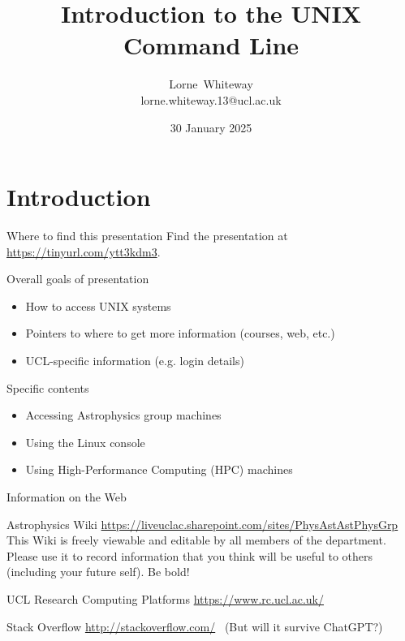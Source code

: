 \documentclass{beamer}
\title{Introduction to the UNIX Command Line}
\author{Lorne~Whiteway \\ lorne.whiteway.13@ucl.ac.uk}
\institute[UCL]
{
  Astrophysics Group\\
  Department of Physics and Astronomy\\
  University College London
}
\date
{30 January 2025}
\begin{document}
\frame{\titlepage}

\section{Introduction}

\begin{frame}{Where to find this presentation}
    Find the presentation at \alert{\url{https://tinyurl.com/ytt3kdm3}}.\\
\end{frame}


\begin{frame}{Overall goals of presentation}
  \begin{itemize}
    \item How to access UNIX systems
    \item Pointers to where to get more information (courses, web, etc.)
    \item UCL-specific information (e.g. login details)
  \end{itemize}
\end{frame}

\begin{frame}{Specific contents}
  \begin{itemize}
    \item Accessing Astrophysics group machines
    \item Using the Linux console
    \item Using High-Performance Computing (HPC) machines
  \end{itemize}
\end{frame}

\begin{frame}{Information on the Web}
  \begin{block}{Astrophysics Wiki}
    \url{https://liveuclac.sharepoint.com/sites/PhysAstAstPhysGrp}
    This Wiki is freely viewable and editable by all members of the department. Please use it to record information that you think will be useful to others (including your future self). Be bold!
  \end{block}

  \begin{block}{UCL Research Computing Platforms}
    \url{https://www.rc.ucl.ac.uk/}
  \end{block}
  
  \begin{block}{Stack Overflow}
    \url{http://stackoverflow.com/}  \ (But will it survive ChatGPT?)
  \end{block}
  
\end{frame}
\end{document}
